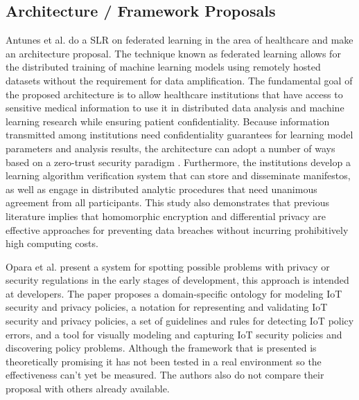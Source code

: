 \subsection{Architecture / Framework Proposals}

Antunes et al. \cite{AntunesFederated} do a SLR on federated learning in
the area of healthcare and make an architecture proposal. The technique
known as federated learning allows for the distributed training of machine
learning models using remotely hosted datasets without the requirement for
data amplification. The fundamental goal of the proposed architecture is
to allow healthcare institutions that have access to sensitive medical information
to use it in distributed data analysis and machine learning research while
ensuring patient confidentiality. Because information transmitted among
institutions need confidentiality guarantees for learning model parameters
and analysis results, the architecture can adopt a number of ways based on
a zero-trust security paradigm \cite{ChenSecurity}. Furthermore, the institutions
develop a learning algorithm verification system that can store and disseminate
manifestos, as well as engage in distributed analytic procedures that need
unanimous agreement from all participants. This study also demonstrates
that previous literature implies that homomorphic encryption and differential
privacy are effective approaches for preventing data breaches without incurring
prohibitively high computing costs.


Opara et al. \cite{opara2022framework} present a system for spotting possible
problems with privacy or security regulations in the early stages of development,
this approach is intended at developers. The paper proposes a domain-specific
ontology for modeling IoT security and privacy policies, a notation for
representing and validating IoT security and privacy policies, a set of
guidelines and rules for detecting IoT policy errors, and a tool for visually
modeling and capturing IoT security policies and discovering policy problems.
Although the framework that is presented is theoretically promising it has
not been tested in a real environment so the effectiveness can't yet be
measured. The authors also do not compare their proposal with others already
available.

